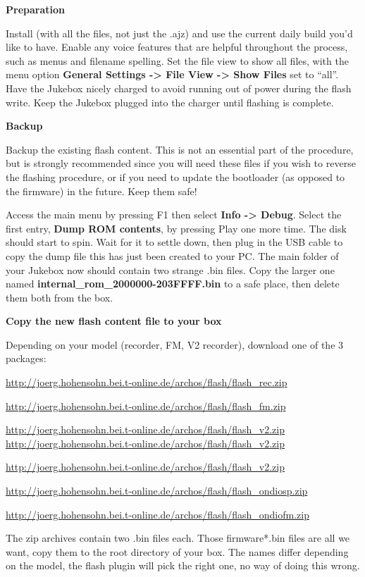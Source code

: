 \textbf{Preparation}

Install (with all the files, not just the .ajz) and use the current
daily build you'd like to have. Enable any voice
features that are helpful throughout the process, such as menus and
filename spelling. Set the file view to show all files, with  the menu
option \textbf{General Settings {}-{\textgreater} File View
{}-{\textgreater} Show Files} set to ``all''.
Have the Jukebox nicely charged to avoid
running out of power during the flash write.  Keep the Jukebox plugged
into the charger until flashing is complete.

{\bfseries
Backup }

Backup the existing flash content.  This is not an essential part of the
procedure, but is strongly recommended since you will need these files
if you wish to reverse the flashing procedure, or if you need to update
the bootloader (as opposed to the firmware) in the future.  Keep them
safe!

Access the main menu by pressing F1 then select \textbf{Info
{}-{\textgreater} Debug}.  Select the first entry, \textbf{Dump ROM
contents}, by pressing Play one more time. The disk should start to
spin. Wait for it to settle down, then plug in the USB cable  to copy
the dump file this has just been created to your PC. The main folder of
your Jukebox now should contain two strange .bin files. Copy the larger
one named
\textbf{internal\_rom\_2000000{}-203FFFF.bin}
to a safe place, then delete them both from the box. 

{\bfseries
Copy the new flash content file to your box }

Depending on your model (recorder, FM, V2 recorder), download one of the
3 packages: 

\url{http://joerg.hohensohn.bei.t-online.de/archos/flash/flash_rec.zip}

\url{http://joerg.hohensohn.bei.t-online.de/archos/flash/flash_fm.zip}

\url{http://joerg.hohensohn.bei.t-online.de/archos/flash/flash_v2.zip}
\url{http://joerg.hohensohn.bei.t-online.de/archos/flash/flash_v2.zip}

\url{http://joerg.hohensohn.bei.t-online.de/archos/flash/flash_v2.zip}

\url{http://joerg.hohensohn.bei.t-online.de/archos/flash/flash_ondiosp.zip}

\url{http://joerg.hohensohn.bei.t-online.de/archos/flash/flash_ondiofm.zip}

The zip archives contain two .bin files each. Those firmware*.bin files
are all we want, copy them to the root directory of your box. The names
differ depending on the model, the flash
plugin will pick the right one, no way of
doing this wrong. 


